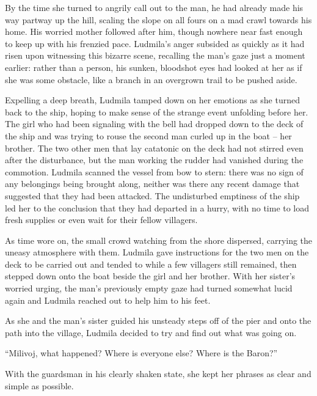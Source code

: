  

By the time she turned to angrily call out to the man, he had already made his way partway up the hill, scaling the slope on all fours on a mad crawl towards his home. His worried mother followed after him, though nowhere near fast enough to keep up with his frenzied pace. Ludmila's anger subsided as quickly as it had risen upon witnessing this bizarre scene, recalling the man's gaze just a moment earlier: rather than a person, his sunken, bloodshot eyes had looked at her as if she was some obstacle, like a branch in an overgrown trail to be pushed aside.

 

Expelling a deep breath, Ludmila tamped down on her emotions as she turned back to the ship, hoping to make sense of the strange event unfolding before her. The girl who had been signaling with the bell had dropped down to the deck of the ship and was trying to rouse the second man curled up in the boat – her brother. The two other men that lay catatonic on the deck had not stirred even after the disturbance, but the man working the rudder had vanished during the commotion. Ludmila scanned the vessel from bow to stern: there was no sign of any belongings being brought along, neither was there any recent damage that suggested that they had been attacked. The undisturbed emptiness of the ship led her to the conclusion that they had departed in a hurry, with no time to load fresh supplies or even wait for their fellow villagers.

 

As time wore on, the small crowd watching from the shore dispersed, carrying the uneasy atmosphere with them. Ludmila gave instructions for the two men on the deck to be carried out and tended to while a few villagers still remained, then stepped down onto the boat beside the girl and her brother. With her sister's worried urging, the man's previously empty gaze had turned somewhat lucid again and Ludmila reached out to help him to his feet.

 

As she and the man’s sister guided his unsteady steps off of the pier and onto the path into the village, Ludmila decided to try and find out what was going on.

 

“Milivoj, what happened? Where is everyone else? Where is the Baron?”

 

With the guardsman in his clearly shaken state, she kept her phrases as clear and simple as possible.

